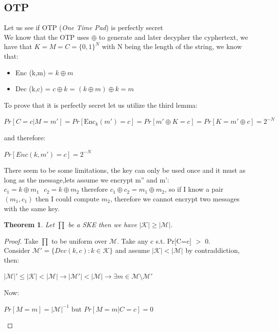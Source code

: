 \documentclass[11pt, a4paper]{article}
\newtheorem{thm}{Theorem}
\begin{document}
\subsection{OTP}
Let us see if OTP (\textit{One Time Pad}) is perfectly secret\\
We know that the OTP uses $\oplus$ to generate and later decypher the cyphertext, we have that $K=M=C=\{0,1\}^N$ with N being the length of the string, we know that:
\begin{itemize}
    \item Enc (k,m) = $k \oplus m$
    \item Dec (k,c) = $c \oplus k$ = $(k \oplus m) \oplus k = m$
\end{itemize}
To prove that it is perfectly secret let us utilize the third lemma:
\begin{center}
    $Pr[C=c | M=m'] = Pr[\text{Enc}_k (m') = c] = Pr[m' \oplus K = c] = Pr[K = m' \oplus c] = 2^{-N}$
\end{center}
and therefore:\\
\begin{center}
    $Pr[Enc(k,m') = c] = 2^{-N}$
\end{center}
There seem to be some limitations, the key can only be used once and it must as long as the message,lets assume we encrypt m'' and m':
$c_1 = k \oplus m_1\text{    } c_2 = k \oplus m_2 \text{ therefore } c_1 \oplus c_2 = m_1 \oplus m_2$, so if I know a pair $(m_1,c_1) \text{ then I could compute } m_2$, therefore we cannot encrypt two messages with the same key.
\begin{thm}
Let $\prod$ be a SKE then we have $|\mathcal{K}| \ge |\mathcal{M}|$.
\end{thm}
\begin{proof}
Take $\prod$ to be uniform over $\mathcal{M}$. Take any c s.t. Pr[C=c] $>$ 0.\\
Consider $\mathcal{M'} = \{Dec(k,c): k \in \mathcal{K}\}$ and assume $|\mathcal{K}| < |\mathcal{M}|$ by contraddiction, then:\\
\begin{center}
    $|\mathcal{M}|' \leq |\mathcal{K}| < |\mathcal{M}| \rightarrow |\mathcal{M'}| < |\mathcal{M}| \rightarrow \exists m \in \mathcal{M} \setminus \mathcal{M'}$
\end{center}
Now:\\
\begin{center}
   $ Pr[M=m] = |\mathcal{M}|^{-1} \text{ but } Pr[M=m | C=c] = 0 $
\end{center}

\end{proof}
\end{document}
